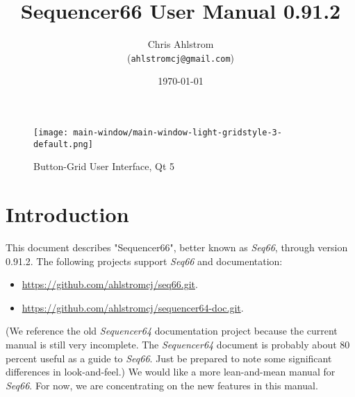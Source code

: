 \documentclass[
 11pt,
 twoside,
 a4paper,
 headinclude,
 footinclude,
 final                                 %
]{article}
\begin{document}
\title{Sequencer66 User Manual 0.91.2}
\author{Chris Ahlstrom \\
   (\texttt{ahlstromcj@gmail.com})}
\date{\today}
\maketitle


\begin{figure}[H]
   \centering 
   \texttt{[image: main-window/main-window-light-gridstyle-3-default.png]}
   \caption*{Button-Grid User Interface, Qt 5}
\end{figure}

\clearpage                             %

\tableofcontents
\listoffigures                         %
\listoftables                          %


\setlength{\parindent}{2em}
\setlength{\parskip}{1ex plus 0.5ex minus 0.2ex}

\section{Introduction}
\label{sec:introduction}

   This document describes "Sequencer66", better known as
   \textsl{Seq66},
   through version 0.91.2.
   The following projects support \textsl{Seq66} and documentation:

   \begin{itemize}
      \item \url{https://github.com/ahlstromcj/seq66.git}.
      \item \url{https://github.com/ahlstromcj/sequencer64-doc.git}.
   \end{itemize}

   (We reference the old \textsl{Sequencer64} documentation project because
   the current manual is still very incomplete.  The \textsl{Sequencer64}
   document is probably about 80 percent useful as a guide to \textsl{Seq66}.
   Just be prepared to note some significant differences in look-and-feel.)
   We would like a more lean-and-mean manual for \textsl{Seq66}.
   For now, we are concentrating on the new features in this manual.
\end{document}
